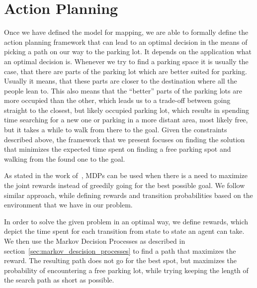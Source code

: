 
\section{Action Planning} %
\label{sec:action_planning}

    Once we have defined the model for mapping, we are able to formally define
    the action planning framework that can lead to an optimal decision in the
    means of picking a path on our way to the parking lot. It depends on the
    application what an optimal decision is. Whenever we try to find a parking
    space it is usually the case, that there are parts of the parking lot
    which are better suited for parking. Usually it means, that these parts
    are closer to the destination where all the people lean to. This also
    means that the ``better'' parts of the parking lots are more occupied than
    the other, which leads us to a trade-off between going straight to the
    closest, but likely occupied parking lot, which results in spending time
    searching for a new one or parking in a more distant area, most likely
    free, but it takes a while to walk from there to the goal. Given the
    constraints described above, the framework that we present focuses on
    finding the solution that minimizes the expected time spent on finding a
    free parking spot and walking from the found one to the goal.

    As stated in the work of~\cite{tipaldiICRA11}, MDPs can be used when there is a need to maximize the joint rewards instead of greedily going for the best possible goal.
    We follow similar approach, while defining rewards and transition probabilities based on the environment that we have in our problem.

    In order to solve the given problem in an optimal way, we define rewards, which depict the time spent for each transition from state to state an agent can take. We then use the Markov Decision Processes as described in section~\ref{sec:markov_descision_processes} to find a path that maximizes the reward.
    The resulting path does not go for the best spot, but maximizes the probability of encountering a free parking lot, while trying keeping the length of the search path as short as possible.

